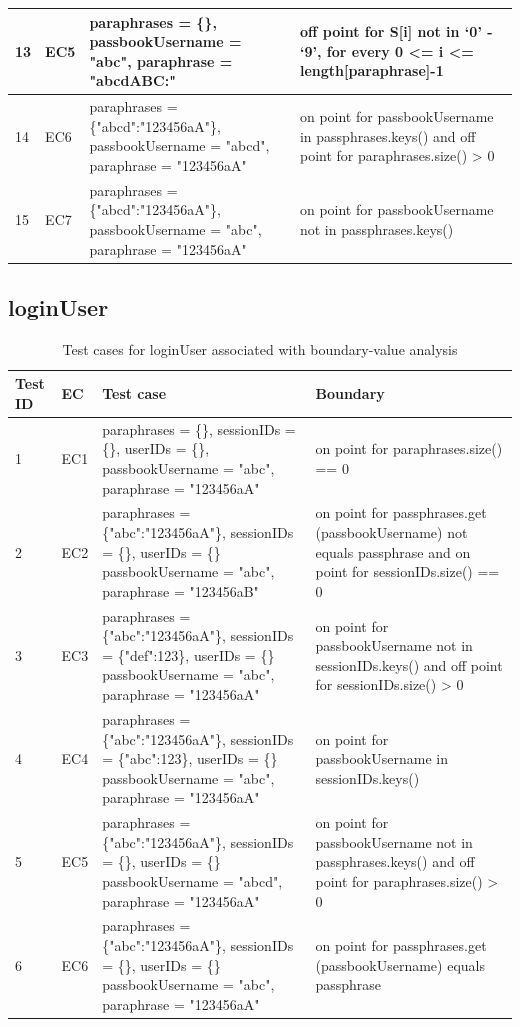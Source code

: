 \documentclass{article}
\begin{document}
\begin{longtable}{|p{0.5cm}|p{0.5cm}|p{7cm}|p{5cm}|}
\hline
13&EC5&paraphrases = \{\}, passbookUsername = "abc", paraphrase = "abcdABC:"&off point for S[i] not in ‘0’ - ‘9’, for every 0 <= i <= length[paraphrase]-1\\
\hline
14&EC6&paraphrases = \{"abcd":"123456aA"\}, passbookUsername = "abcd", paraphrase = "123456aA"&on point for passbookUsername in passphrases.keys() and off point for paraphrases.size() > 0\\
\hline
15&EC7&paraphrases = \{"abcd":"123456aA"\}, passbookUsername = "abc", paraphrase = "123456aA"&on point for passbookUsername not in passphrases.keys()\\
\hline
\end{longtable}

\subsection{loginUser}
\begin{longtable}{|p{0.5cm}|p{0.5cm}|p{7cm}|p{5cm}|}
\caption{Test cases for loginUser associated with boundary-value analysis}\\
\hline 
Test ID&EC&Test case&Boundary\\
\hline  
1&EC1&paraphrases = \{\}, sessionIDs = \{\}, userIDs = \{\}, passbookUsername = "abc", paraphrase = "123456aA"&on point for paraphrases.size() == 0\\
\hline
2&EC2&paraphrases = \{"abc":"123456aA"\}, sessionIDs = \{\}, userIDs = \{\} passbookUsername = "abc", paraphrase = "123456aB"&on point for passphrases.get (passbookUsername) not equals passphrase and on point for sessionIDs.size() == 0\\
\hline
3&EC3&paraphrases = \{"abc":"123456aA"\}, sessionIDs = \{"def":123\}, userIDs = \{\} passbookUsername = "abc", paraphrase = "123456aA"&on point for passbookUsername not in sessionIDs.keys() and off point for sessionIDs.size() > 0\\
\hline
4&EC4&paraphrases = \{"abc":"123456aA"\}, sessionIDs = \{"abc":123\}, userIDs = \{\} passbookUsername = "abc", paraphrase = "123456aA"&on point for passbookUsername in sessionIDs.keys()\\
\hline
5&EC5&paraphrases = \{"abc":"123456aA"\}, sessionIDs = \{\}, userIDs = \{\} passbookUsername = "abcd", paraphrase = "123456aA"&on point for passbookUsername not in passphrases.keys() and off point for paraphrases.size() > 0\\
\hline
6&EC6&paraphrases = \{"abc":"123456aA"\}, sessionIDs = \{\}, userIDs = \{\} passbookUsername = "abc", paraphrase = "123456aA"&on point for passphrases.get (passbookUsername) equals passphrase\\
\hline
\end{longtable}
\end{document}
